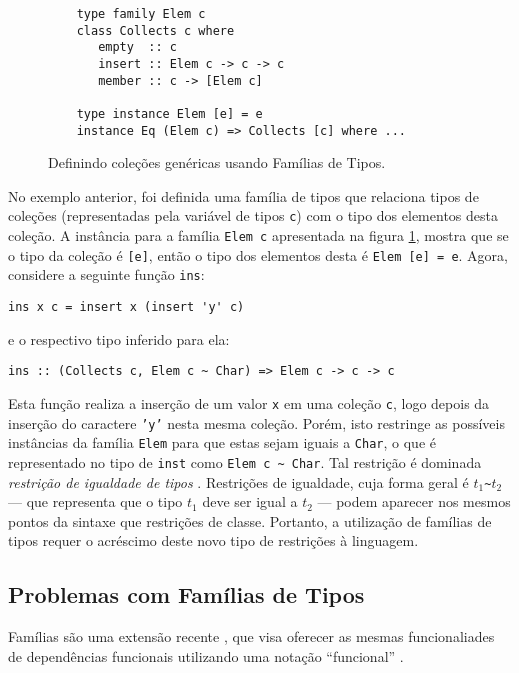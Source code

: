\begin{figure}[h]
	\begin{verbatim}
	type family Elem c
	class Collects c where
	   empty  :: c
	   insert :: Elem c -> c -> c
	   member :: c -> [Elem c]
	   
	type instance Elem [e] = e
	instance Eq (Elem c) => Collects [c] where ...
	\end{verbatim}
	\centering
	\caption{Definindo cole\c{c}\~oes gen\'ericas usando Fam\'ilias de Tipos.}
	\label{famcolex}
\end{figure}

No exemplo anterior, foi definida uma fam\'ilia de tipos que relaciona tipos de cole\c{c}\~oes (representadas pela 
vari\'avel de tipos \texttt{c}) com o tipo dos elementos desta cole\c{c}\~ao. A inst\^ancia para a fam\'ilia 
\texttt{Elem c} apresentada na figura \ref{famcolex}, mostra que se o tipo da cole\c{c}\~ao \'e \texttt{[e]}, ent\~ao
o tipo dos elementos desta \'e \texttt{Elem [e] = e}. Agora, considere a seguinte fun\c{c}\~ao \texttt{ins}:
\begin{center}
	\verb|ins x c = insert x (insert 'y' c)|
\end{center}
e o respectivo tipo inferido para ela:
\begin{center}
    \verb|ins :: (Collects c, Elem c ~ Char) => Elem c -> c -> c|
\end{center}
Esta fun\c{c}\~ao realiza a inser\c{c}\~ao de um valor \texttt{x} em uma cole\c{c}\~ao \texttt{c}, logo depois da 
inser\c{c}\~ao do caractere \texttt{'y'} nesta mesma cole\c{c}\~ao. Por\'em, isto restringe as poss\'iveis inst\^ancias
da fam\'ilia \texttt{Elem} para que estas sejam iguais a \texttt{Char}, o que \'e representado no tipo de \texttt{inst}
como \verb|Elem c ~ Char|. Tal restri\c{c}\~ao \'e dominada \emph{restri\c{c}\~ao de igualdade de tipos} 
\cite{Sulzmann07, Schrijvers2008}. Restri\c{c}\~oes de igualdade, cuja forma geral \'e 
$t_{1}$\verb|~|$t_{2}$ --- que representa que o tipo $t_{1}$ deve ser igual a $t_{2}$ --- podem aparecer nos mesmos
pontos da sintaxe que restri\c{c}\~oes de classe. Portanto, a utiliza\c{c}\~ao de fam\'ilias de tipos requer o 
acr\'escimo deste novo tipo de restri\c{c}\~oes \`a linguagem.

\subsection{Problemas com Fam\'ilias de Tipos}\label{tyfunproblems}

Fam\'ilias s\~ao uma extens\~ao recente \cite{Schrijvers2008}, que visa oferecer as mesmas
funcionaliades de depend\^encias funcionais utilizando uma nota\c{c}\~ao ``funcional'' \cite{Chakravarty05}. 

